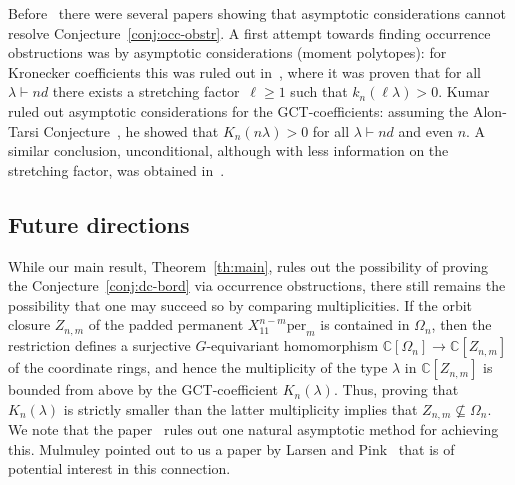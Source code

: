 \documentclass[11pt]{amsart}
\def\C{\mathbb{C}}
\def\per{\mathrm{per}}
\def\Sym{\mathsf{Sym}}
\newcommand{\Det}{\Omega}
\def\la{\lambda}
\def\ocp{Z}
\newcommand{\kron}{k}
\newcommand{\gctm}{K}
\newcommand{\plethc}{a}
\numberwithin{equation}{section}
\begin{document}
Before~\cite{ik-panova:15} there were several papers showing 
that asymptotic considerations cannot resolve Conjecture~\ref{conj:occ-obstr}. 
A first attempt towards finding occurrence obstructions 
was by asymptotic considerations (moment polytopes): 
for Kronecker coefficients 
this was ruled out in~\cite{buci:09}, where it  
was proven that for all $\la\vdash nd$ 
there exists a stretching factor~$\ell\ge 1$ such that $\kron_n(\ell\la) > 0$. 
Kumar~\cite{Kum:15} 
ruled out asymptotic considerations for 
the GCT-coefficients: assuming the Alon-Tarsi Conjecture~\cite{AT:92}, 
he showed that %
$\gctm_n(n\la) > 0$ for all $\la\vdash nd$ and even $n$.
A similar conclusion, unconditional, although with less information on the stretching factor, 
was obtained in~\cite{BHI:15}. 


\subsection{Future directions}

While our main result, Theorem~\ref{th:main},  
rules out the possibility of proving 
the Conjecture~\ref{conj:dc-bord} via occurrence obstructions, 
there still remains the possibility that one may succeed so 
by comparing multiplicities. 
If the orbit closure $\ocp_{n,m}$ of the padded permanent
$X_{11}^{n-m} \per_m$ is contained in $\Det_n$, then 
the restriction defines a surjective $G$-equivariant homomorphism 
$\C[\Omega_n]\to\C[\ocp_{n,m}]$ of the coordinate rings, 
and hence  the multiplicity of the type $\la$ in 
$\C[\ocp_{n,m}]$ is bounded from above by
the GCT-coefficient $\gctm_n(\la)$. 
Thus, proving that $\gctm_n(\la)$ is strictly smaller 
than the latter multiplicity implies that  
$\ocp_{n,m}\not\subseteq\Det_n$. 
We note that the paper~\cite{cdw:12} rules out 
one natural asymptotic method for achieving this.
Mulmuley pointed out to us a paper by 
Larsen and Pink~\cite{lapa:90} that is of 
potential interest in this connection. 

\end{document}
